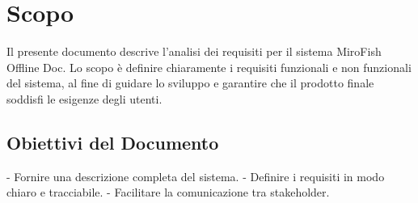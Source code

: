 \section{Scopo}

Il presente documento descrive l'analisi dei requisiti per il sistema MiroFish Offline Doc. Lo scopo è definire chiaramente i requisiti funzionali e non funzionali del sistema, al fine di guidare lo sviluppo e garantire che il prodotto finale soddisfi le esigenze degli utenti.

\subsection{Obiettivi del Documento}

- Fornire una descrizione completa del sistema.
- Definire i requisiti in modo chiaro e tracciabile.
- Facilitare la comunicazione tra stakeholder.
